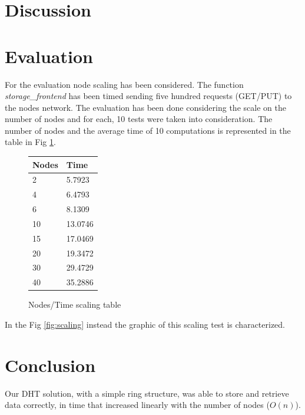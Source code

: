 \documentclass[11pt,conference]{IEEEtran}
\begin{document}
\section{Discussion}



\section{Evaluation}
For the evaluation node scaling has been considered. The function \textit{storage\_frontend} has been timed sending five hundred requests (GET/PUT) to the nodes network. The evaluation has been done considering the scale on the number of nodes and for each, 10 tests were taken into consideration.
\newline
The number of nodes and the average time of 10 computations is represented in the table in Fig \ref{tab:scaling}.

\begin{figure}[h!]
\centering
\caption{Nodes/Time scaling table}
\begin{tabular}[H]{ | l | l | }
\hline
	Nodes & Time \\ \hline
	2 & 5.7923 \\ \hline
	4 & 6.4793 \\ \hline
	6 & 8.1309 \\ \hline
	10 & 13.0746 \\ \hline
	15 & 17.0469 \\ \hline
	20 & 19.3472 \\ \hline
	30 & 29.4729 \\ \hline
	40 & 35.2886 \\ \hline
\end{tabular}
\label{tab:scaling}
\end{figure}

In the Fig \ref{fig:scaling} instead the graphic of this scaling test is characterized.




\section{Conclusion}

Our DHT solution, with a simple ring structure, was able to store and retrieve
data correctly, in time that increased linearly with the number of nodes
($O(n)$).




\end{document}
